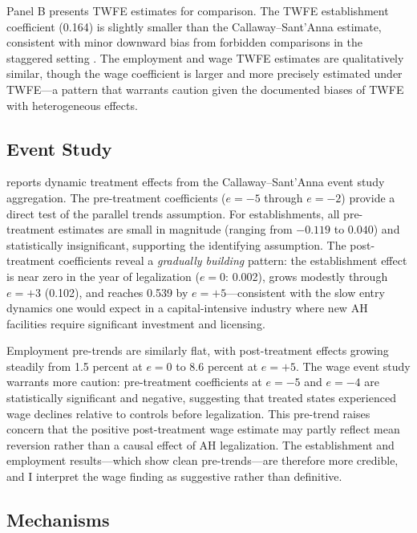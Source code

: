 \documentclass[12pt]{article}
\begin{document}
Panel B presents TWFE estimates for comparison. The TWFE establishment coefficient (0.164) is slightly smaller than the Callaway--Sant'Anna estimate, consistent with minor downward bias from forbidden comparisons in the staggered setting \citep{goodmanbacon2021difference}. The employment and wage TWFE estimates are qualitatively similar, though the wage coefficient is larger and more precisely estimated under TWFE---a pattern that warrants caution given the documented biases of TWFE with heterogeneous effects.

\subsection{Event Study}



 reports dynamic treatment effects from the Callaway--Sant'Anna event study aggregation. The pre-treatment coefficients ($e = -5$ through $e = -2$) provide a direct test of the parallel trends assumption. For establishments, all pre-treatment estimates are small in magnitude (ranging from $-0.119$ to $0.040$) and statistically insignificant, supporting the identifying assumption. The post-treatment coefficients reveal a \emph{gradually building} pattern: the establishment effect is near zero in the year of legalization ($e = 0$: 0.002), grows modestly through $e = +3$ (0.102), and reaches 0.539 by $e = +5$---consistent with the slow entry dynamics one would expect in a capital-intensive industry where new AH facilities require significant investment and licensing.

Employment pre-trends are similarly flat, with post-treatment effects growing steadily from 1.5 percent at $e = 0$ to 8.6 percent at $e = +5$. The wage event study warrants more caution: pre-treatment coefficients at $e = -5$ and $e = -4$ are statistically significant and negative, suggesting that treated states experienced wage declines relative to controls before legalization. This pre-trend raises concern that the positive post-treatment wage estimate may partly reflect mean reversion rather than a causal effect of AH legalization. The establishment and employment results---which show clean pre-trends---are therefore more credible, and I interpret the wage finding as suggestive rather than definitive.

\subsection{Mechanisms}
\end{document}

